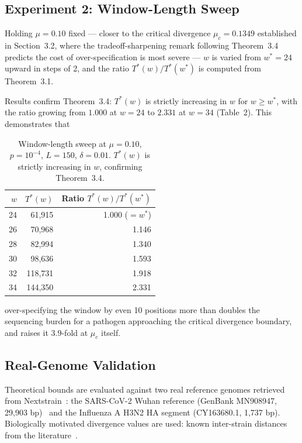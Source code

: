 \documentclass[12pt]{article}
\theoremstyle{definition}
\theoremstyle{plain}
\begin{document}
\subsection{Experiment 2: Window-Length Sweep}

Holding $\mu=0.10$ fixed --- closer to the critical divergence
$\mu_c=0.1349$ established in Section~3.2, where the tradeoff-sharpening
remark following Theorem~3.4 predicts the cost of over-specification is most
severe --- $w$ is varied from $w^{*}=24$ upward in steps of 2, and the ratio
$T^{*}(w)/T^{*}(w^{*})$ is computed from Theorem~3.1.

Results confirm Theorem~3.4: $T^{*}(w)$ is strictly increasing in $w$ for
$w\ge w^{*}$, with the ratio growing from $1.000$ at $w=24$ to $2.331$ at
$w=34$ (Table~2). This demonstrates that

\begin{table}[!ht]
\centering
\small
\begin{tabular}{rrr}
\toprule
$w$ & $T^{*}(w)$ & Ratio $T^{*}(w)/T^{*}(w^{*})$ \\
\midrule
24 &  61,915 & 1.000 ($=w^{*}$) \\
26 &  70,968 & 1.146 \\
28 &  82,994 & 1.340 \\
30 &  98,636 & 1.593 \\
32 & 118,731 & 1.918 \\
34 & 144,350 & 2.331 \\
\bottomrule
\end{tabular}
\caption{Window-length sweep at $\mu=0.10$, $p=10^{-4}$, $L=150$,
$\delta=0.01$. $T^{*}(w)$ is strictly increasing in $w$, confirming
Theorem~3.4.}
\end{table}

over-specifying the window by even 10 positions more than doubles the
sequencing burden for a pathogen approaching the critical divergence
boundary, and raises it $3.9$-fold at $\mu_c$ itself.

\subsection{Real-Genome Validation}

Theoretical bounds are evaluated against two real reference genomes retrieved
from Nextstrain~\cite{nextstrain}: the SARS-CoV-2 Wuhan reference (GenBank
MN908947, 29,903 bp)~\cite{wu2020} and the Influenza A H3N2 HA segment
(CY163680.1, 1,737 bp). Biologically motivated divergence values are used:
known inter-strain distances from the
literature~\cite{viana2022,bedford2010}.
\end{document}

